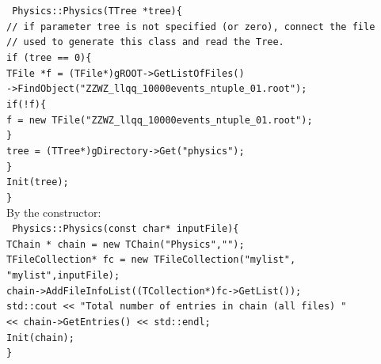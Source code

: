 \documentclass[12pt]{article}
\begin{document}
\texttt{
\hspace*{0.0cm}Physics::Physics(TTree *tree)\{ \\
\hspace*{0.2cm}// if parameter tree is not specified (or zero), connect the file\\
\hspace*{0.2cm}// used to generate this class and read the Tree.\\
\hspace*{0.2cm}if (tree == 0)\{\\
\hspace*{0.4cm}TFile *f = (TFile*)gROOT->GetListOfFiles()\\
\hspace*{2.6cm}->FindObject("ZZWZ\_llqq\_10000events\_ntuple\_01.root");\\
\hspace*{0.4cm}if(!f)\{\\
\hspace*{0.6cm}f = new TFile("ZZWZ\_llqq\_10000events\_ntuple\_01.root");\\
\hspace*{0.4cm}\}\\
\hspace*{0.4cm}tree = (TTree*)gDirectory->Get("physics");\\
\hspace*{0.2cm}\}\\
\hspace*{0.2cm} Init(tree);\\
\hspace*{0.0cm}\}}
\\
By the constructor:\\
\texttt{
\hspace*{0.0cm}Physics::Physics(const char* inputFile)\{ \\
\hspace*{0.2cm}TChain * chain = new TChain("Physics","");\\
\hspace*{0.2cm}TFileCollection* fc = new TFileCollection("mylist", "mylist",inputFile);\\
\hspace*{0.2cm}chain->AddFileInfoList((TCollection*)fc->GetList());\\
\hspace*{0.2cm}std::cout << "Total  number of entries in chain (all files) " \\
\hspace*{2.4cm}<<  chain->GetEntries() << std::endl;\\
\hspace*{0.2cm}Init(chain);\\
\hspace*{0.0cm}\}\\
}
\end{document}
